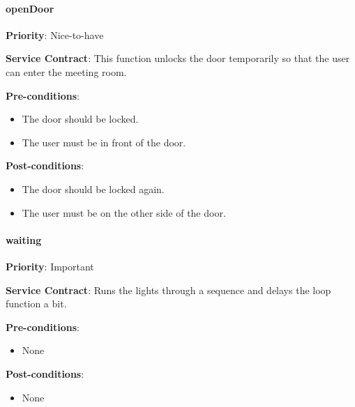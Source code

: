 		\paragraph{openDoor}
			\begin{description}
			    \item{\textbf{Priority}:} Nice-to-have%
			    \item{\textbf{Service Contract}:} This function unlocks the door temporarily so that the user can enter the meeting room.
			    \item{\textbf{Pre-conditions}:}%
    			    \begin{itemize}
    			        \item The door should be locked.
    			        \item The user must be in front of the door.
    			    \end{itemize}
			    \item{\textbf{Post-conditions}:} %
    			    \begin{itemize}
    			        \item The door should be locked again.
    			        \item The user must be on the other side of the door.
    			    \end{itemize}
			\end{description}
			
		\paragraph{waiting}
			\begin{description}
			    \item{\textbf{Priority}:} Important%
			    \item{\textbf{Service Contract}:} Runs the lights through a sequence and delays the loop function a bit. 
			    \item{\textbf{Pre-conditions}:}%
    			    \begin{itemize}
    			        \item None
    			    \end{itemize}
			    \item{\textbf{Post-conditions}:} %
    			    \begin{itemize}
    			        \item None
    			    \end{itemize}
			\end{description}
			
